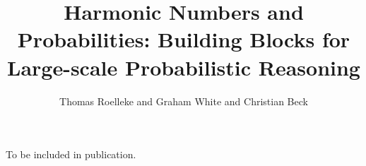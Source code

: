 \documentclass[prodmode,acmjacm]{acmsmall}
\title{Harmonic Numbers and Probabilities: Building Blocks for Large-scale Probabilistic Reasoning}
\author{Thomas Roelleke and Graham White and Christian Beck}
\date{}
\begin{document}
\begin{bottomstuff}

\end{bottomstuff}

\maketitle



\begin{acks}
To be included in publication.
\end{acks}

 
%

%
%
%
%



\end{document}
